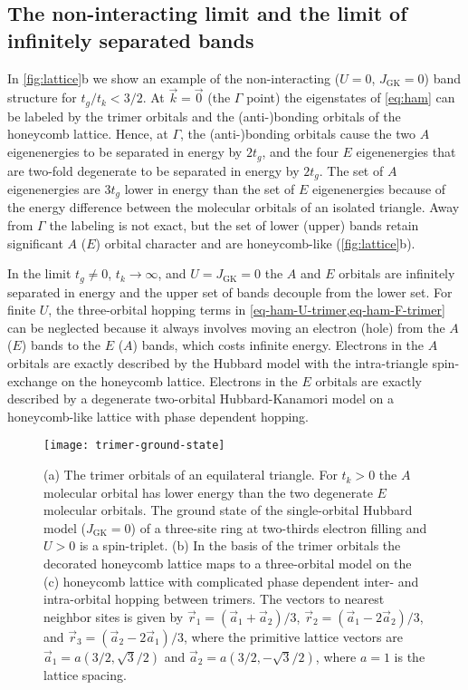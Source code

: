 \documentclass[reprint,aps,prb,amsmath,amssymb]{revtex4-2}
\begin{document}
\subsection{The non-interacting limit and the limit of infinitely separated bands} \label{sec:non-interacting-limit}

In \cref{fig:lattice}b we show an example of the non-interacting ($U = 0$, $J_{\mathrm{GK}} = 0$) band structure for $t_g/t_k < 3/2$. At $\vec{k}=\vec{0}$ (the $\Gamma$ point) the eigenstates of \cref{eq:ham} can be labeled by the trimer orbitals and the (anti-)bonding orbitals of the honeycomb lattice. Hence, at $\Gamma$, the (anti-)bonding orbitals cause the two $A$ eigenenergies to be separated in energy by $2t_g$, and the four $E$ eigenenergies that are two-fold degenerate to be separated in energy by $2t_g$. The set of $A$ eigenenergies are $3t_g$ lower in energy than the set of $E$ eigenenergies because of the energy difference between the molecular orbitals of an isolated triangle. Away from $\Gamma$ the labeling is not exact, but the set of lower (upper) bands retain significant $A$ ($E$) orbital character and are honeycomb-like (\cref{fig:lattice}b).

In the limit $t_g \neq 0$, $t_k \rightarrow \infty$, and $U = J_{\mathrm{GK}} = 0$ the $A$ and $E$ orbitals are infinitely separated in energy and the upper set of bands decouple from the lower set. For finite $U$, the three-orbital hopping terms in \cref{eq-ham-U-trimer,eq-ham-F-trimer} can be neglected because it always involves moving an electron (hole) from the $A$ ($E$) bands to the $E$ ($A$) bands, which costs infinite energy. Electrons in the $A$ orbitals are exactly described by the Hubbard model with the intra-triangle spin-exchange on the honeycomb lattice. Electrons in the $E$ orbitals are exactly described by a degenerate two-orbital Hubbard-Kanamori model on a honeycomb-like lattice with phase dependent hopping. 

\begin{figure}
	\centering
	\texttt{[image: trimer-ground-state]}
	\caption{\label{fig:trimer-ground-state}
		(a) The trimer orbitals of an equilateral triangle. For $t_k >0$ the $A$ molecular orbital has lower energy than the two degenerate $E$ molecular orbitals. The ground state of the single-orbital Hubbard model ($J_{\mathrm{GK}} = 0$) of a three-site ring at two-thirds electron filling and $U>0$ is a spin-triplet.
		(b) In the basis of the trimer orbitals the decorated honeycomb lattice maps to a three-orbital model on the
		(c) honeycomb lattice with complicated phase dependent inter- and intra-orbital hopping between trimers. The vectors to nearest neighbor sites is given by $\vec{r}_1 = (\vec{a}_1 + \vec{a}_2) / 3$, $\vec{r}_2 = (\vec{a}_1 - 2 \vec{a}_2) / 3$, and $\vec{r}_3 = (\vec{a}_2 - 2 \vec{a}_1)/3$, where the primitive lattice vectors are $\vec{a}_1 = a(3/2, \sqrt{3}/2)$ and $\vec{a}_2 = a(3/2, -\sqrt{3}/2)$, where $a = 1$ is the lattice spacing.
	}
\end{figure}
\end{document}
